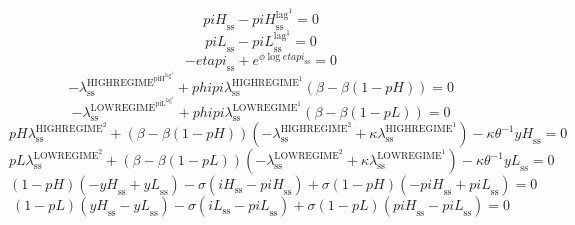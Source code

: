 \begin{equation}
{p\!i\!H}_\mathrm{ss} - {p\!i\!H}^{\mathrm{lag}^{\mathrm{1}}}_\mathrm{ss} = 0
\end{equation}
\begin{equation}
{p\!i\!L}_\mathrm{ss} - {p\!i\!L}^{\mathrm{lag}^{\mathrm{1}}}_\mathrm{ss} = 0
\end{equation}
\begin{equation}
-{e\!t\!a\!p\!i}_\mathrm{ss} + e^{{\phi} {\log{{e\!t\!a\!p\!i}_\mathrm{ss}}}} = 0
\end{equation}
\begin{equation}
-\lambda^{\mathrm{HIGHREGIME}^{\mathrm{piH}^{\mathrm{lag}^{\mathrm{1}}}}}_\mathrm{ss} + {{p\!h\!i\!p\!i}} {\lambda^{\mathrm{HIGHREGIME}^{\mathrm{1}}}_\mathrm{ss}} \left(\beta - {\beta} \left(1 - {p\!H}\right)\right) = 0
\end{equation}
\begin{equation}
-\lambda^{\mathrm{LOWREGIME}^{\mathrm{piL}^{\mathrm{lag}^{\mathrm{1}}}}}_\mathrm{ss} + {{p\!h\!i\!p\!i}} {\lambda^{\mathrm{LOWREGIME}^{\mathrm{1}}}_\mathrm{ss}} \left(\beta - {\beta} \left(1 - {p\!L}\right)\right) = 0
\end{equation}
\begin{equation}
{{p\!H}} {\lambda^{\mathrm{HIGHREGIME}^{\mathrm{2}}}_\mathrm{ss}} + \left(\beta - {\beta} \left(1 - {p\!H}\right)\right) \left(-\lambda^{\mathrm{HIGHREGIME}^{\mathrm{2}}}_\mathrm{ss} + {\kappa} {\lambda^{\mathrm{HIGHREGIME}^{\mathrm{1}}}_\mathrm{ss}}\right) - {\kappa} {\theta}^{-1} {{y\!H}_\mathrm{ss}} = 0
\end{equation}
\begin{equation}
{{p\!L}} {\lambda^{\mathrm{LOWREGIME}^{\mathrm{2}}}_\mathrm{ss}} + \left(\beta - {\beta} \left(1 - {p\!L}\right)\right) \left(-\lambda^{\mathrm{LOWREGIME}^{\mathrm{2}}}_\mathrm{ss} + {\kappa} {\lambda^{\mathrm{LOWREGIME}^{\mathrm{1}}}_\mathrm{ss}}\right) - {\kappa} {\theta}^{-1} {{y\!L}_\mathrm{ss}} = 0
\end{equation}
\begin{equation}
\left(1 - {p\!H}\right) \left(-{y\!H}_\mathrm{ss} + {y\!L}_\mathrm{ss}\right) - {\sigma} \left({i\!H}_\mathrm{ss} - {p\!i\!H}_\mathrm{ss}\right) + {\sigma} \left(1 - {p\!H}\right) \left(-{p\!i\!H}_\mathrm{ss} + {p\!i\!L}_\mathrm{ss}\right) = 0
\end{equation}
\begin{equation}
\left(1 - {p\!L}\right) \left({y\!H}_\mathrm{ss} - {y\!L}_\mathrm{ss}\right) - {\sigma} \left({i\!L}_\mathrm{ss} - {p\!i\!L}_\mathrm{ss}\right) + {\sigma} \left(1 - {p\!L}\right) \left({p\!i\!H}_\mathrm{ss} - {p\!i\!L}_\mathrm{ss}\right) = 0
\end{equation}
